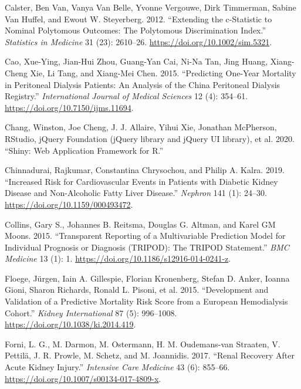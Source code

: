 \documentclass[
]{article}
\newlength{\cslhangindent}
\newenvironment{cslreferences}%
  {\setlength{\parindent}{0pt}%
  \everypar{\setlength{\hangindent}{\cslhangindent}}\ignorespaces}%
  {\par}
\begin{document}
\begin{cslreferences}
\leavevmode\hypertarget{ref-calster_extending_2012-1}{}%
Calster, Ben Van, Vanya Van Belle, Yvonne Vergouwe, Dirk Timmerman, Sabine Van Huffel, and Ewout W. Steyerberg. 2012. ``Extending the c-Statistic to Nominal Polytomous Outcomes: The Polytomous Discrimination Index.'' \emph{Statistics in Medicine} 31 (23): 2610--26. \url{https://doi.org/10.1002/sim.5321}.

\leavevmode\hypertarget{ref-cao_predicting_2015}{}%
Cao, Xue-Ying, Jian-Hui Zhou, Guang-Yan Cai, Ni-Na Tan, Jing Huang, Xiang-Cheng Xie, Li Tang, and Xiang-Mei Chen. 2015. ``Predicting One-Year Mortality in Peritoneal Dialysis Patients: An Analysis of the China Peritoneal Dialysis Registry.'' \emph{International Journal of Medical Sciences} 12 (4): 354--61. \url{https://doi.org/10.7150/ijms.11694}.

\leavevmode\hypertarget{ref-chang_shiny_2020}{}%
Chang, Winston, Joe Cheng, J. J. Allaire, Yihui Xie, Jonathan McPherson, RStudio, jQuery Foundation (jQuery library and jQuery UI library), et al. 2020. ``Shiny: Web Application Framework for R.''

\leavevmode\hypertarget{ref-chinnadurai_increased_2019-1}{}%
Chinnadurai, Rajkumar, Constantina Chrysochou, and Philip A. Kalra. 2019. ``Increased Risk for Cardiovascular Events in Patients with Diabetic Kidney Disease and Non-Alcoholic Fatty Liver Disease.'' \emph{Nephron} 141 (1): 24--30. \url{https://doi.org/10.1159/000493472}.

\leavevmode\hypertarget{ref-collins_transparent_2015}{}%
Collins, Gary S., Johannes B. Reitsma, Douglas G. Altman, and Karel GM Moons. 2015. ``Transparent Reporting of a Multivariable Prediction Model for Individual Prognosis or Diagnosis (TRIPOD): The TRIPOD Statement.'' \emph{BMC Medicine} 13 (1): 1. \url{https://doi.org/10.1186/s12916-014-0241-z}.

\leavevmode\hypertarget{ref-floege_development_2015}{}%
Floege, Jürgen, Iain A. Gillespie, Florian Kronenberg, Stefan D. Anker, Ioanna Gioni, Sharon Richards, Ronald L. Pisoni, et al. 2015. ``Development and Validation of a Predictive Mortality Risk Score from a European Hemodialysis Cohort.'' \emph{Kidney International} 87 (5): 996--1008. \url{https://doi.org/10.1038/ki.2014.419}.

\leavevmode\hypertarget{ref-forni_renal_2017-1}{}%
Forni, L. G., M. Darmon, M. Ostermann, H. M. Oudemans-van Straaten, V. Pettilä, J. R. Prowle, M. Schetz, and M. Joannidis. 2017. ``Renal Recovery After Acute Kidney Injury.'' \emph{Intensive Care Medicine} 43 (6): 855--66. \url{https://doi.org/10.1007/s00134-017-4809-x}.


\end{cslreferences}
\end{document}
